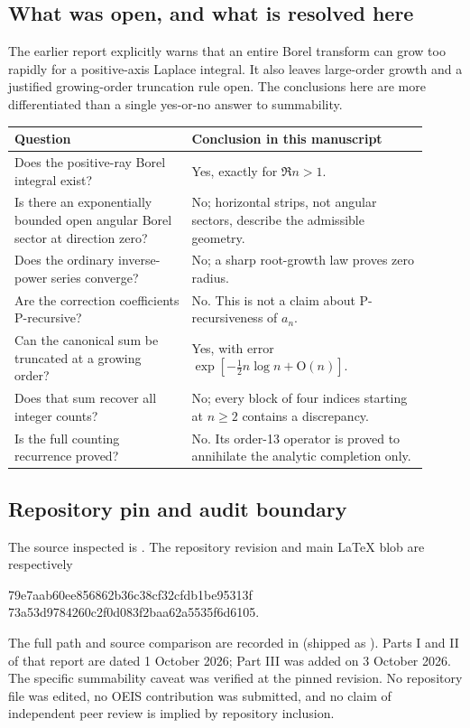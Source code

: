 \documentclass[11pt]{article}
\numberwithin{equation}{section}
\theoremstyle{definition}
\theoremstyle{remark}
\theoremstyle{definition}
\newcommand{\bigO}{\mathrm O}
\begin{document}
\subsection{What was open, and what is resolved here}

The earlier report explicitly warns that an entire Borel transform can grow
too rapidly for a positive-axis Laplace integral. It also leaves large-order
growth and a justified growing-order truncation rule open. The conclusions
here are more differentiated than a single yes-or-no answer to summability.

\begin{center}
\small
\renewcommand{\arraystretch}{1.18}
\begin{tabular}{>{\raggedright\arraybackslash}p{0.39\linewidth}>{\raggedright\arraybackslash}p{0.52\linewidth}}
\toprule
Question & Conclusion in this manuscript\\
\midrule
Does the positive-ray Borel integral exist? & Yes, exactly for $\Re n>1$.\\
Is there an exponentially bounded open angular Borel sector at direction zero?
 & No; horizontal strips, not angular sectors, describe the admissible geometry.\\
Does the ordinary inverse-power series converge? & No; a sharp root-growth law proves zero radius.\\
Are the correction coefficients P-recursive? & No. This is not a claim about P-recursiveness of $a_n$.\\
Can the canonical sum be truncated at a growing order? & Yes, with error $\exp[-\tfrac12 n\log n+\bigO(n)]$.\\
Does that sum recover all integer counts? & No; every block of four indices starting at $n\ge2$ contains a discrepancy.\\
Is the full counting recurrence proved? & No. Its order-13 operator is proved to annihilate the analytic completion only.\\
\bottomrule
\end{tabular}
\end{center}

\subsection{Repository pin and audit boundary}

The source inspected is \cite{bcProveIt}. The repository revision and main
LaTeX blob are respectively
\begin{center}
\small\ttfamily
79e7aab60ee856862b36c38cf32cfdb1be95313f\\
73a53d9784260c2f0d083f2baa62a5535f6d6105.
\end{center}
The full path and source comparison are recorded in 
(shipped as \allowbreak{}). Parts I and II of that report
are dated 1 October 2026; Part III was added on 3 October 2026. The specific
summability caveat was verified at the pinned revision. No repository file
was edited, no OEIS contribution was submitted, and no claim of independent
peer review is implied by repository inclusion.
\end{document}
